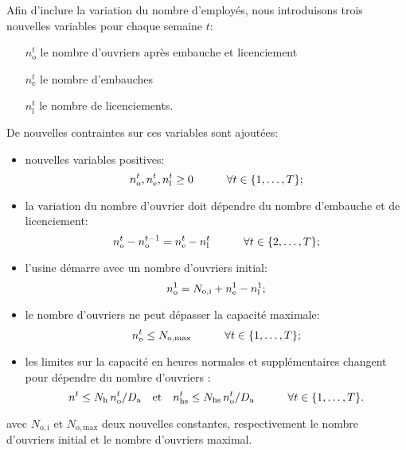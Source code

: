 Afin d'inclure la variation du nombre d'employés, nous introduisons trois nouvelles variables pour chaque semaine $t$:

\begin{itemize}[before={\renewcommand\makelabel[1]{\makebox[1cm][r]{##1\hspace{.2cm}}}}]
    \item[$n_\mathrm{o}^t$] le nombre d'ouvriers après embauche et licenciement
    \item[$n_\mathrm{e}^t$] le nombre d'embauches
    \item[$n_\mathrm{l}^t$] le nombre de licenciements.
\end{itemize}

De nouvelles contraintes sur ces variables sont ajoutées:

\begin{itemize}
    \item nouvelles variables positives:
    \[
        n_\mathrm{o}^t, n_\mathrm{e}^t, n_\mathrm{l}^t \geq 0
        \qquad\quad \forall t \in \{1,\dots,T\}
        \text;
    \]
    
    \item la variation du nombre d'ouvrier doit dépendre du nombre d'embauche et de licenciement:
    \[
        n_\mathrm{o}^t - n_\mathrm{o}^{t-1} = n_\mathrm{e}^t - n_\mathrm{l}^t
        \qquad\quad \forall t \in \{2,\dots,T\}
        \text;
    \]
    
    \item l'usine démarre avec un nombre d'ouvriers initial:
    \[
        n_\mathrm{o}^1 = N_\mathrm{o,i} + n_\mathrm{e}^1 - n_\mathrm{l}^1
        \text;
    \]
    
    \item le nombre d'ouvriers ne peut dépasser la capacité maximale:
    \[
        n_\mathrm{o}^t \leq N_\mathrm{o,max}
        \qquad\quad \forall t \in \{1,\dots,T\}
        \text;
    \]
    
    \item les limites sur la capacité en heures normales et supplémentaires changent pour dépendre du nombre d'ouvriers :
    \[
        n^t \leq N_\mathrm{h}\,n_\mathrm{o}^t/D_\mathrm{a}
        \quad\mathrm{et}\quad
        n_\mathrm{hs}^t \leq N_\mathrm{hs}\,n_\mathrm{o}^t/D_\mathrm{a}
        \qquad\quad \forall t \in \{1,\dots,T\}
        \text.
    \]
\end{itemize}
avec $N_\mathrm{o,i}$ et $N_\mathrm{o,max}$ deux nouvelles constantes, respectivement le nombre d'ouvriers initial et le nombre d'ouvriers maximal.

